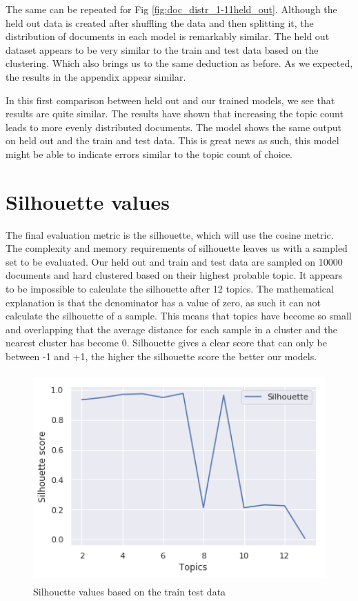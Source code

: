 The same can be repeated for Fig \ref{fig:doc_distr_1-11held_out}. Although the held out data is created after shuffling the data and then splitting it, the distribution of documents in each model is remarkably similar. The held out dataset appears to be very similar to the train and test data based on the clustering. Which also brings us to the same deduction as before. As we expected, the results in the appendix appear similar. 

In this first comparison between held out and our trained models, we see that results are quite similar. The results have shown that increasing the topic count leads to more evenly distributed documents. The model shows the same output on held out and the train and test data. This is great news as such, this model might be able to indicate errors similar to the topic count of choice. 
\FloatBarrier

\section{Silhouette values}\label{results:silhouette}
The final evaluation metric is the silhouette, which will use the cosine metric. The complexity and memory requirements of silhouette leaves us with a sampled set to be evaluated. Our held out and train and test data are sampled on 10000 documents and hard clustered based on their highest probable topic. It appears to be impossible to calculate the silhouette after 12 topics. The mathematical explanation is that the denominator has a value of zero, as such it can not calculate the silhouette of a sample. This means that topics have become so small and overlapping that the average distance for each sample in a cluster and the nearest cluster has become 0. Silhouette gives a clear score that can only be between -1 and +1, the higher the silhouette score the better our models.

\begin{figure}[h]
    \centering
    \includegraphics[width=15cm, height=8cm]{figures/silhouette_values_topics_corpus.png}
    \caption{Silhouette values based on the train test data}
    \label{fig:Train test dataset}
\end{figure}
\FloatBarrier

